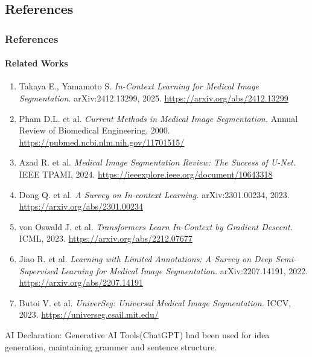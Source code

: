 \documentclass[nometaot,lecture,amberg,toc=twocolumn,indicatelastpageofframe,footlinebox]{OTHAWbeamer}
\begin{document}
\subsection{References}
\begin{frame}
    \frametitle{References}
    \framesubtitle{Related Works}

    {\tiny
    \begin{enumerate}
        \item Takaya E., Yamamoto S. \textit{In-Context Learning for Medical Image Segmentation.}
              arXiv:2412.13299, 2025.
              \url{https://arxiv.org/abs/2412.13299}

        \item Pham D.L. et al. \textit{Current Methods in Medical Image Segmentation.}
              Annual Review of Biomedical Engineering, 2000.
              \url{https://pubmed.ncbi.nlm.nih.gov/11701515/}

        \item Azad R. et al. \textit{Medical Image Segmentation Review: The Success of U-Net.}
              IEEE TPAMI, 2024.
              \url{https://ieeexplore.ieee.org/document/10643318}

        \item Dong Q. et al. \textit{A Survey on In-context Learning.}
              arXiv:2301.00234, 2023.
              \url{https://arxiv.org/abs/2301.00234}

        \item von Oswald J. et al. \textit{Transformers Learn In-Context by Gradient Descent.}
              ICML, 2023.
              \url{https://arxiv.org/abs/2212.07677}

        \item Jiao R. et al. \textit{Learning with Limited Annotations: A Survey on Deep
              Semi-Supervised Learning for Medical Image Segmentation.}
              arXiv:2207.14191, 2022.
              \url{https://arxiv.org/abs/2207.14191}

        \item Butoi V. et al. \textit{UniverSeg: Universal Medical Image Segmentation.}
              ICCV, 2023.
              \url{https://universeg.csail.mit.edu/}
    \end{enumerate}
    }

    \vspace{0.5em}
    {\tiny\textcolor{grau2}{AI Declaration: Generative AI Tools(ChatGPT) had been used for idea generation, maintaining grammer and sentence structure.}}

\end{frame}
\end{document}

